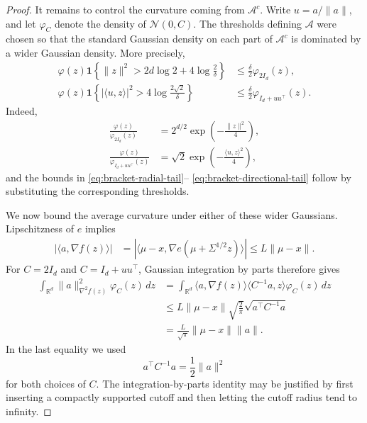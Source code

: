 \documentclass{article}
\theoremstyle{plain}
\theoremstyle{definition}
\theoremstyle{plain}
\newcommand{\R}{\mathbb R}
\newcommand{\cN}{\mathcal N}
\begin{document}
\begin{proof}
    It remains to control the curvature coming from $\mathcal A^c$.
    Write $u=a/\|a\|$, and let $\varphi_C$ denote the density of
    $\cN(0,C)$. The thresholds defining $\mathcal A$ were chosen so
    that the standard Gaussian density on each part of
    $\mathcal A^c$ is dominated by a wider Gaussian density. More
    precisely,
    \begin{align}
        \varphi(z)
        \mathbf 1
        \left\{
        \|z\|^2>
        2d\log 2+4\log\frac{2}{\delta}
        \right\}
         & \leq
        \frac{\delta}{2}\varphi_{2I_d}(z),
        \label{eq:bracket-radial-tail}
        \\
        \varphi(z)
        \mathbf 1
        \left\{
        |\langle u,z\rangle|^2>
        4\log\frac{2\sqrt{2}}{\delta}
        \right\}
         & \leq
        \frac{\delta}{2}\varphi_{I_d+uu^\top}(z).
        \label{eq:bracket-directional-tail}
    \end{align}
    Indeed,
    \begin{align}
        \frac{\varphi(z)}{\varphi_{2I_d}(z)}
         & =
        2^{d/2}\exp\left(-\frac{\|z\|^2}{4}\right),
        \\
        \frac{\varphi(z)}{\varphi_{I_d+uu^\top}(z)}
         & =
        \sqrt2
        \exp\left(-\frac{\langle u,z\rangle^2}{4}\right),
    \end{align}
    and the bounds in
    \eqref{eq:bracket-radial-tail}--%
    \eqref{eq:bracket-directional-tail} follow by substituting the
    corresponding thresholds.

    We now bound the average curvature under either of these wider
    Gaussians. Lipschitzness of $e$ implies
    \begin{align}
        |\langle a,\nabla f(z)\rangle|
         & =
        |\langle\mu-x,
        \nabla e(\mu+\Sigma^{1/2}z)\rangle|
        \leq
        L\|\mu-x\|.
        \label{eq:bracket-directional-lipschitz}
    \end{align}
    For $C=2I_d$ and $C=I_d+uu^\top$, Gaussian integration by parts
    therefore gives
    \begin{align}
        \int_{\R^d}
        \|a\|_{\nabla^2f(z)}^2
        \varphi_C(z)\,dz
         & =
        \int_{\R^d}
        \langle a,\nabla f(z)\rangle
        \langle C^{-1}a,z\rangle
        \varphi_C(z)\,dz
        \nonumber \\
         & \leq
        L\|\mu-x\|
        \sqrt{\frac{2}{\pi}}
        \sqrt{a^\top C^{-1}a}
        \nonumber \\
         & =
        \frac{L}{\sqrt\pi}
        \|\mu-x\|\|a\|.
        \label{eq:bracket-tail-curvature}
    \end{align}
    In the last equality we used
    \[
        a^\top C^{-1}a=\frac12\|a\|^2
    \]
    for both choices of $C$. The integration-by-parts identity may
    be justified by first inserting a compactly supported cutoff and
    then letting the cutoff radius tend to infinity.


\end{proof}
\end{document}

